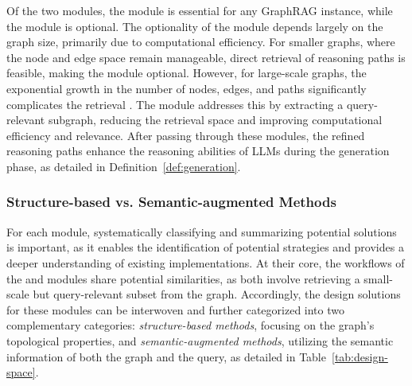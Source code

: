 


\vspace{-5pt}
Of the two modules, the {\it \retrieval} module is essential for any GraphRAG instance, while the {\it \preRetrieval} module is optional.
The optionality of the {\it \preRetrieval} module depends largely on the graph size, primarily due to computational efficiency. 
For smaller graphs, where the node and edge space remain manageable, direct retrieval of reasoning paths is feasible, making the {\it \preRetrieval} module optional. 
However, for large-scale graphs, the exponential growth in the number of nodes, edges, and paths significantly complicates the retrieval {\cite{BigGraphVLDB,PrismX,SummaryBigGraph,SysBigGraph}}. 
The {\it \preRetrieval} module addresses this by extracting a query-relevant subgraph, reducing the retrieval space and improving computational efficiency and relevance.
After passing through these modules, the refined reasoning paths enhance the reasoning abilities of LLMs during the generation phase, as detailed in Definition~\ref{def:generation}.


\vspace{-5pt}
\subsubsection{\bf Structure-based {\bf vs.} Semantic-augmented Methods}


For each module, systematically classifying and summarizing potential solutions is important, as it enables the identification of potential strategies and provides a deeper understanding of existing implementations.  
At their core, the workflows of the {\it \preRetrieval} and {\it \retrieval} modules share potential similarities, as both involve 
retrieving a small-scale but query-relevant subset from the graph.
Accordingly, the design solutions for these modules can be interwoven and further categorized into two complementary categories: {\it structure-based methods}, focusing on the graph's topological properties, and {\it semantic-augmented methods}, utilizing the semantic information of both the graph and the query, as detailed in Table~\ref{tab:design-space}.

